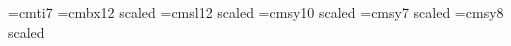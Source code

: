 


\font\sevenit=cmti7                       %
\font\ExampleTitleFont=cmbx12 scaled %
\font\ExampleTypeFont=cmsl12 scaled  %
\font\ExampleTypeCal=cmsy10 scaled   %
\font\SmExampleTypeCal=cmsy7 scaled  %
\font\BigEightsy=cmsy8 scaled        %
\def\ExampleTypeFonts{\textfont2=\ExampleTypeCal 
                    \scriptfont2=\SmExampleTypeCal
                    \let\Eightsy\BigEightsy \ExampleTypeFont}


\def\EnoughAlready{$$\vdots$$ \EndPage}


\newtoks\Author             %
\newtoks\BookTitle          %
\newtoks\PublishInfo        %
\newtoks\CopyrightDate      %
\newtoks\Example            %
\newtoks\ExampleType        %
\newcount\ExampleNumber     %
\newcount\StartExample      %
\newdimen\LMarginOdd        %
\newdimen\LMarginEven       %

